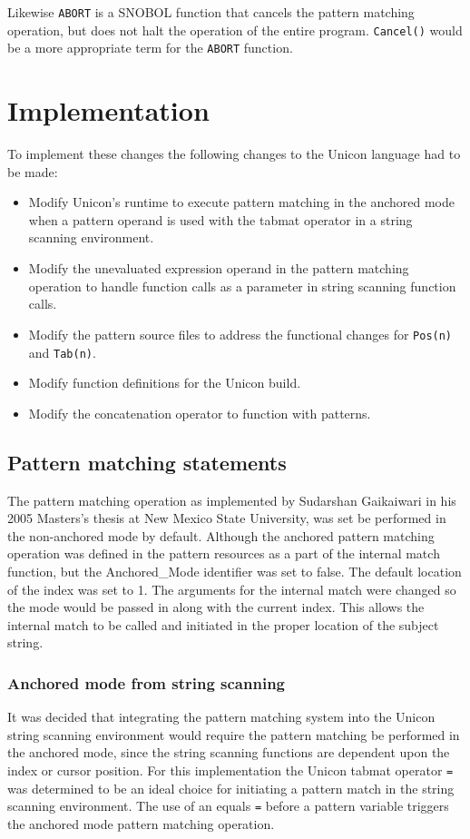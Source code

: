\documentclass{article}
\begin{document}
Likewise \texttt{ABORT} is a SNOBOL function that cancels the pattern matching operation, but does not halt the operation of the entire program.  \texttt{Cancel()} would be a more appropriate term for the \texttt{ABORT} function.

\section{Implementation}
To implement these changes the following changes to the Unicon language had to be made:
\begin{itemize}
\item Modify Unicon's runtime to execute pattern matching in the anchored mode when a pattern operand is used with the tabmat operator in a string scanning environment.
\item Modify the unevaluated expression operand in the pattern matching operation to handle function calls as a parameter in string scanning function calls.
\item Modify the pattern source files to address the functional changes for \texttt{Pos(n)} and \texttt{Tab(n)}.
\item Modify function definitions for the Unicon build.
\item Modify the concatenation operator to function with patterns.
\end{itemize}

\subsection{Pattern matching statements}
The pattern matching operation as implemented by Sudarshan Gaikaiwari in his 2005 Masters's thesis at New Mexico State University, was set be performed in the non-anchored mode by default.  Although the anchored pattern matching operation was defined in the pattern resources as a part of the internal match function, but the Anchored\_Mode identifier was set to false.  The default location of the index was set to 1.  The arguments for the internal match were changed so the mode would be passed in along with the current index.  This allows the internal match to be called and initiated in the proper location of the subject string.

\subsubsection{Anchored mode from string scanning}
It was decided that integrating the pattern matching system into the Unicon string scanning environment would require the pattern matching be performed in the anchored mode, since the string scanning functions are dependent upon the index or cursor position.  For this implementation the Unicon tabmat operator \texttt{=} was determined to be an ideal choice for initiating a pattern match in the string scanning environment.  The use of an equals \texttt{=} before a pattern variable triggers the anchored mode pattern matching operation.
 
\end{document}
